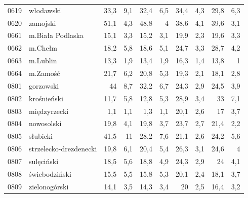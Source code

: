 \begin{center}
\begin{longtable}{lp{3cm}rrrrrrrr}
0619 & włodawski               & 33,3    & 9,1         & 32,4     & 6,5          & 34,4     & 4,3          & 29,8     & 6,3          \\
0620 & zamojski                & 51,1    & 4,3         & 48,8     & 4            & 38,6     & 4,1          & 39,6     & 3,1          \\
0661 & m.Biała Podlaska        & 15,1    & 3,3         & 15,2     & 3,1          & 19,9     & 2,3          & 19,6     & 3,3          \\
0662 & m.Chełm                 & 18,2    & 5,8         & 18,6     & 5,1          & 24,7     & 3,3          & 28,7     & 4,2          \\
0663 & m.Lublin                & 13,3    & 1,9         & 13,4     & 1,9          & 16,3     & 1,4          & 13,8     & 1            \\
0664 & m.Zamość                & 21,7    & 6,2         & 20,8     & 5,3          & 19,3     & 2,1          & 18,1     & 2,8          \\
0801 & gorzowski               & 44      & 8,7         & 32,2     & 6,7          & 24,3     & 2,9          & 24,5     & 3,9          \\
0802 & krośnieński             & 11,7    & 5,8         & 12,8     & 5,3          & 28,9     & 3,4          & 33       & 7,1          \\
0803 & międzyrzecki            & 1,1     & 1,1         & 1,3      & 1,1          & 20,1     & 2,6          & 17       & 3,7          \\
0804 & nowosolski              & 19,8    & 4,1         & 19,8     & 3,7          & 23,7     & 2,7          & 21,4     & 2,2          \\
0805 & słubicki                & 41,5    & 11          & 28,2     & 7,6          & 21,1     & 2,6          & 24,2     & 5,6          \\
0806 & strzelecko-drezdenecki  & 19,8    & 6,1         & 20,4     & 5,4          & 26,3     & 3,1          & 24,6     & 4            \\
0807 & sulęciński              & 18,5    & 5,6         & 18,8     & 4,9          & 24,3     & 2,9          & 24       & 4,1          \\
0808 & świebodziński           & 15,5    & 5,5         & 15,8     & 5,3          & 20,1     & 2,4          & 18,1     & 3,7          \\
0809 & zielonogórski           & 14,1    & 3,5         & 14,3     & 3,4          & 20       & 2,5          & 16,4     & 3,2          \\

\end{longtable}
\end{center}
